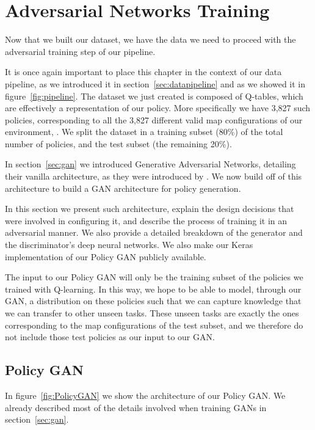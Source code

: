 
\chapter{Adversarial Networks Training} %
\label{Chapter5} %

Now that we built our dataset, we have the data we need to proceed with the adversarial training step of our pipeline.

It is once again important to place this chapter in the context of our data pipeline, as we introduced it in section~\ref{sec:datapipeline} and as we showed it in figure~\ref{fig:pipeline}. The dataset we just created is composed of Q-tables, which are effectively a representation of our policy.  More specifically we have 3,827 such policies, corresponding to all the 3,827 different valid map configurations of our environment, . We split the dataset in a training subset (80\%) of the total number of policies, and the test subset (the remaining 20\%).

In section~\ref{sec:gan} we introduced Generative Adversarial Networks, detailing their vanilla architecture, as they were introduced by \citeauthor{goodfellow2014generative}. We now build off of this architecture to build a GAN architecture for policy generation.

In this section we present such architecture, explain the design decisions that were involved in configuring it, and describe the process of training it in an adversarial manner. We also provide a detailed breakdown of the generator and the discriminator's deep neural networks. We also make our Keras implementation of our Policy GAN publicly available.

The input to our Policy GAN will only be the training subset of the policies we trained with Q-learning. In this way, we hope to be able to model, through our GAN, a distribution on these policies such that we can capture knowledge that we can transfer to other unseen tasks.
These unseen tasks are exactly the ones corresponding to the map configurations of the test subset, and we therefore do not include those test policies as our input to our GAN.


\section{Policy GAN}
In figure~\ref{fig:PolicyGAN} we show the architecture of our Policy GAN.
We already described most of the details involved when training GANs in section~\ref{sec:gan}. 


